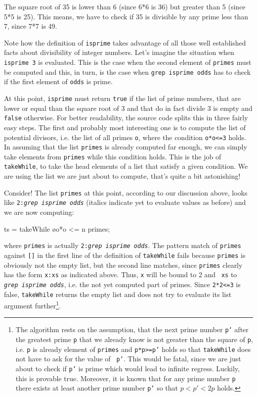 \documentclass[a4paper,landscape,twocolumn]{report}
\newenvironment{code}[0]{\verbatim}{\endverbatim}
\begin{document}
The square root of 35 is lower than 6 (since 6*6 is 36) but greater than
5
(since 5*5 is 25). This means, we have to check if 35 is divisible by
any
prime less than 7, since 7*7 is 49.

Note how the definition of {\tt isprime} takes advantage of all those
well established facts about divisibility of integer numbers. Let's
imagine the situation when {\tt isprime 3} is evaluated. This is
the case when the
second element of {\tt primes} must be computed and this, in turn,
is the case when {\tt grep isprime odds} has to check if the first
element of {\tt odds} is
prime.

At this point, {\tt isprime} must return
{\tt true} if the list of prime numbers,
that are lower or equal than the square root of 3 and that do in
fact divide 3
is empty and {\tt false} otherwise.
For better readability, the source code splits this in
three fairly easy
steps. The first and probably most interesting one is to compute the
list of potential divisors, i.e. the list of all primes {\tt o},
where the condition {\tt o*o<=3} holds.
In assuming that the list {\tt primes} is already computed far enough,
we can simply take elements from {\tt primes} while this
condition holds. This is the job of {\tt takeWhile}, to take the head
elements of a list that satisfy a given condition. We are using the list
we are just about to compute, that's quite a bit astonishing!

Consider! The list {\tt primes} at this point, according to our
discussion above, looks like  {\tt 2:{\it grep isprime odds}}
(italics indicate yet to evaluate values as before)
and we are now
computing:

\begin{code}
ts = takeWhile \o{o*o <= n} primes;
\end{code}

where {\tt primes} is actually {\tt 2:{\it grep isprime odds}}.
The pattern match of {\tt primes} against {\tt []} in the first
line of the definition of {\tt takeWhile} fails
because {\tt primes} is obviously not the empty list,
but the second
line matches, since {\tt primes} clearly has the form {\tt x:xs}
as indicated above. Thus, {\tt x} will be bound to 2 and {\tt
xs} to {\tt {\it grep isprime odds}}, i.e. the not yet computed
part of primes. Since {\tt 2*2<=3} is false, {\tt takeWhile}
returns the empty list and does not try to evaluate its list
argument further\footnote{
The algorithm rests on the assumption, that the next prime number
{\tt p'} after
the greatest prime {\tt p} that we already know
is not greater than the square of {\tt p}, i.e.
{\tt p} is already element of {\tt primes} and
{\tt p*p>=p'}
holds so that {\tt takeWhile} does not have to ask for the value of {\tt
p'}. This would be fatal, since we are just about to check if {\tt p'}
is prime which would lead to infinite regress.
Luckily, this is provable true. Moreover, it is known that for any prime
number {\tt p} there exists at least another
prime number {\tt p'} so that
$p<p'<2p$ holds.
}.
\end{document}
